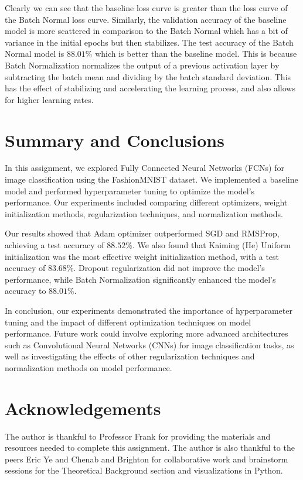 \documentclass[11pt]{amsart}
\begin{document}
Clearly we can see that the baseline loss curve is greater than the loss curve of the Batch Normal loss curve. Similarly, the validation accuracy of the baseline model is more scattered in comparison to the Batch Normal which has a bit of variance in the initial epochs but then stabilizes. The test accuracy of the Batch Normal model is $88.01\%$ which is better than the baseline model. This is because Batch Normalization normalizes the output of a previous activation layer by subtracting the batch mean and dividing by the batch standard deviation. This has the effect of stabilizing and accelerating the learning process, and also allows for higher learning rates.



\section{Summary and Conclusions}\label{sec:conclusions}

In this assignment, we explored Fully Connected Neural Networks (FCNs) for image classification using the FashionMNIST dataset. We implemented a baseline model and performed hyperparameter tuning to optimize the model's performance. Our experiments included comparing different optimizers, weight initialization methods, regularization techniques, and normalization methods.

Our results showed that Adam optimizer outperformed SGD and RMSProp, achieving a test accuracy of $88.52\%$. We also found that Kaiming (He) Uniform initialization was the most effective weight initialization method, with a test accuracy of $83.68\%$. Dropout regularization did not improve the model's performance, while Batch Normalization significantly enhanced the model's accuracy to $88.01\%$.

In conclusion, our experiments demonstrated the importance of hyperparameter tuning and the impact of different optimization techniques on model performance. Future work could involve exploring more advanced architectures such as Convolutional Neural Networks (CNNs) for image classification tasks, as well as investigating the effects of other regularization techniques and normalization methods on model performance.

\section*{Acknowledgements}
The author is thankful to Professor Frank for providing the materials and resources needed to complete this assignment. The author is also thankful to the peers Eric Ye and Chenab and Brighton for collaborative work and brainstorm sessions for the Theoretical Background section and visualizations in Python.


\end{document}
